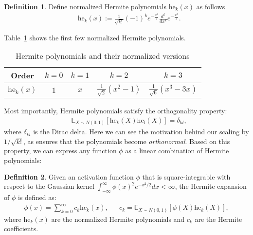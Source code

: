 \documentclass[twoside]{article}
\newcommand{\E}{\mathbb{E}}
\newcommand{\he}{\mathrm{he}}
\newcommand{\He}{\mathrm{He}}
\theoremstyle{definition}
\newtheorem{definition}{Definition}
\begin{document}
\begin{definition}
Define normalized Hermite polynomials $\he_k(x)$ as follows
\begin{align*}
&\he_k(x) :=\frac{1}{\sqrt{k!}}(-1)^k e^{-\frac{x^2}{2}} \frac{d^k}{dx^k} e^{-\frac{x^2}{2}}.
\end{align*}
\end{definition}

Table~\ref{table:hermite_poly} shows the first few normalized Hermite polynomials.

\begin{table}[ht]
    \centering
    \caption{Hermite polynomials and their normalized versions}\label{table:hermite_poly}
    \begin{tabular}{|c|c|c|c|c|}
    \hline
 Order & $k=0$ & $k=1$ & $k=2$ & $k=3$  \\
 \hline
 $\he_k(x)$ & $1$ & $x$ & $\frac{1}{\sqrt{2}} (x^2 - 1)$ & $\frac{1}{\sqrt{6}} (x^3 - 3x)$ \\
    \hline
    \end{tabular}
\end{table}

Most importantly, Hermite polynomials satisfy the orthogonality property:
\begin{align}\label{eq:hermite_orthogonality}
    &\E_{X\sim N(0,1)} \left[\he_k(X)\he_l(X)\right] = \delta_{kl},
\end{align}
where $\delta_{kl}$ is the Dirac delta. Here we can see the motivation behind our scaling by $1/\sqrt{k!}$, as ensures that the polynomials become \emph{orthonormal}.  Based on this property, we can express any function $\phi$ as a linear combination of Hermite polynomials:

\begin{definition}\label{def:hermite_expansion}
Given an activation function $\phi$ that is square-integrable with respect to the Gaussian kernel $\int_{-\infty}^\infty \phi(x)^2 e^{-x^2/2}dx < \infty$, the Hermite expansion of $\phi$ is defined as:
\begin{align*}
\phi(x) = \sum_{k=0}^\infty c_k \he_k(x),&&c_k = \E_{X\sim N(0,1)} \left[\phi(X) \he_k(X)\right],
\end{align*}
where $\he_k(x)$ are the normalized Hermite polynomials and $c_k$ are the Hermite coefficients. 
\end{definition}

\end{document}
